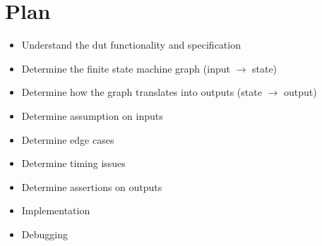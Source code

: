 \chapter{Plan} 
\label{cha:plan}

\begin{itemize}
    \item Understand the dut functionality and specification
    \item Determine the finite state machine graph (input $\rightarrow$ state)
    \item Determine how the graph translates into outputs (state $\rightarrow$ output)
    \item Determine assumption on inputs
    \item Determine edge cases
    \item Determine timing issues
    \item Determine assertions on outputs
    \item Implementation
    \item Debugging
\end{itemize}



